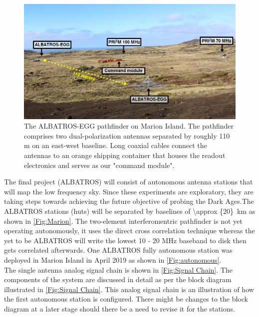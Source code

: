 \documentclass{ws-jai}
\begin{document}
	\begin{figure}[h]
		\begin{center}
			\includegraphics[width=0.7\linewidth]{Figures/ALBATROS-EGG.PNG}
			\caption{The ALBATROS-EGG pathfinder on Marion Island. The pathfinder comprises two dual-polarization antennas separated by roughly 110 m on an east-west baseline. Long coaxial cables connect the antennas to	an orange shipping container that houses the readout electronics and serves as our "command module".}
			\label{Fig:ALBATROS-EGG}
		\end{center}
	\end{figure}

The final project (ALBATROS) will consist of autonomous antenna stations that will map the low frequency sky. Since these experiments are exploratory, they are taking steps towards achieving the future objective of probing the Dark Ages.The ALBATROS stations (huts) will be separated by baselines of \SI{\approx {20}}{km} as shown in \autoref{Fig:Marion}. The two-element interferomentric pathfinder is not yet operating autonomously, it uses the direct cross correlation technique whereas the yet to be ALBATROS will write the lowest 10 - 20 MHz baseband to disk then gets correlated afterwards. One ALBATROS fully autonomous station was deployed in Marion Island in April 2019 as shown in \autoref{Fig:autonomous}. \\

The single antenna analog signal chain is shown in \autoref{Fig:Signal Chain}. The components of the system are discussed in detail as per the block diagram illustrated in \autoref{Fig:Signal Chain}. This analog signal chain is an illustration of how the first autonomous station is configured. There might be changes to the block diagram at a later stage should there be a need to revise it for the stations.
\end{document}
